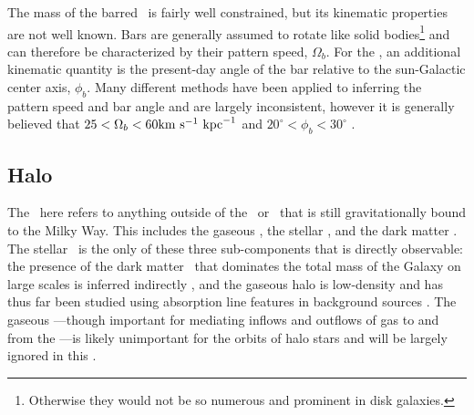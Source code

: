 The mass of the barred \mwbulge\ is fairly well constrained, but its kinematic
properties are not well known. Bars are generally assumed to rotate like solid
bodies\footnote{Otherwise they would not be so numerous and prominent in disk
galaxies.} and can therefore be characterized by their pattern speed,
$\Omega_b$. For the \mwbulge, an additional kinematic quantity is the
present-day angle of the bar relative to the sun-Galactic center axis, $\phi_b$.
Many different methods have been applied to inferring the pattern speed and bar
angle and are largely inconsistent, however it is generally believed that $25 <
\Omega_b < 60 \mathrm{km}~\mathrm{s}^{-1}~\mathrm{kpc}^{-1}$ and $20^\circ < \phi_b < 30^\circ$ \citep{dwek95,
stanek97, debattista02, shen10, wegg13, cao13, wegg15, portail15}.



\subsection{Halo} \label{sec:mw-halo}

The \mwhalo\ here refers to anything outside of the \mwdisk\ or \mwbulge\ that
is still gravitationally bound to the Milky Way. This includes the gaseous
\mwhalo, the stellar \mwhalo, and the dark matter \mwhalo. The stellar \mwhalo\
is the only of these three sub-components that is directly observable: the
presence of the dark matter \mwhalo\ that dominates the total mass of the Galaxy
on large scales is inferred indirectly \citep[e.g.,][]{vandermarel12b}, and the
gaseous halo is low-density and has thus far been studied using absorption line
features in background sources \citep{miller13}. The gaseous \mwhalo---though
important for mediating inflows and outflows of gas to and from the \mwdisk---is
likely unimportant for the orbits of halo stars and will be largely ignored in
this \article. %


